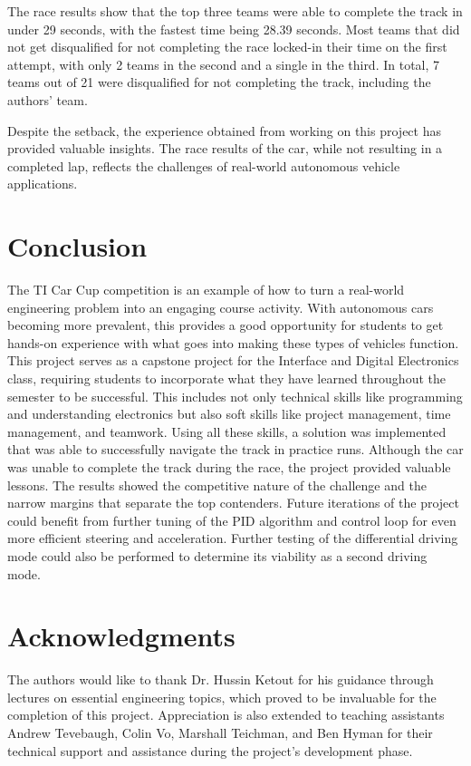 \documentclass[conference]{IEEEtran}
\begin{document}
The race results show that the top three teams were able to complete the track in under 29 seconds, with the fastest time being 28.39 seconds. Most teams that did not get disqualified for not completing the race locked-in their time on the first attempt, with only 2 teams in the second and a single in the third. In total, 7 teams out of 21 were disqualified for not completing the track, including the authors' team.

Despite the setback, the experience obtained from working on this project has provided valuable insights. The race results of the car, while not resulting in a completed lap, reflects the challenges of real-world autonomous vehicle applications.

\section{Conclusion}

The TI Car Cup competition is an example of how to turn a real-world engineering problem into an engaging course activity. With autonomous cars becoming more prevalent, this provides a good opportunity for students to get hands-on experience with what goes into making these types of vehicles function. This project serves as a capstone project for the Interface and Digital Electronics class, requiring students to incorporate what they have learned throughout the semester to be successful. This includes not only technical skills like programming and understanding electronics but also soft skills like project management, time management, and teamwork. Using all these skills, a solution was implemented that was able to successfully navigate the track in practice runs. Although the car was unable to complete the track during the race, the project provided valuable lessons. The results showed the competitive nature of the challenge and the narrow margins that separate the top contenders. Future iterations of the project could benefit from further tuning of the PID algorithm and control loop for even more efficient steering and acceleration. Further testing of the differential driving mode could also be performed to determine its viability as a second driving mode.

\section{Acknowledgments}

The authors would like to thank Dr. Hussin Ketout for his guidance through lectures on essential engineering topics, which proved to be invaluable for the completion of this project. Appreciation is also extended to teaching assistants Andrew Tevebaugh, Colin Vo, Marshall Teichman, and Ben Hyman for their technical support and assistance during the project's development phase.
\end{document}
